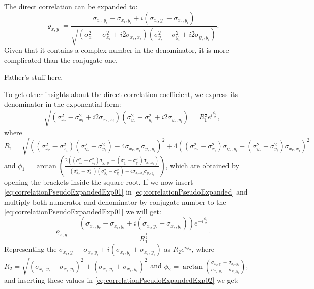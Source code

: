 \documentclass[
]{book}
\begin{document}
The direct correlation can be expanded to:
\begin{equation}
    {\varrho}_{x,y} = \frac{\sigma_{x_r, y_r} - \sigma_{x_i, y_i} + i (\sigma_{x_i, y_r} + \sigma_{x_r, y_i})}{\sqrt{(\sigma_{x_r}^2 - \sigma_{x_i}^2 + i2 \sigma_{x_r,x_i})(\sigma_{y_r}^2 - \sigma_{y_i}^2 + i2 \sigma_{y_r,y_i})}}.
    \label{eq:correlationPseudoExpanded}
\end{equation}
Given that it contains a complex number in the denominator, it is more complicated than the conjugate one.

Father's stuff here.

To get other insights about the direct correlation coefficient, we express its denominator in the exponential form:
\begin{equation}
    {\sqrt{(\sigma_{x_r}^2 - \sigma_{x_i}^2 + i2 \sigma_{x_r,x_i})(\sigma_{y_r}^2 - \sigma_{y_i}^2 + i2 \sigma_{y_r,y_i})}} = R_1^{\frac{1}{2}} e^{i \frac{\phi_1}{2}},
    \label{eq:correlationPseudoExpandedExp01}
\end{equation}
where \(R_1 = \sqrt{\left((\sigma_{x_r}^2 - \sigma_{x_i}^2)(\sigma_{y_r}^2 - \sigma_{y_i}^2) - 4 \sigma_{x_r,x_i} \sigma_{y_r,y_i} \right)^2+ 4 \left( (\sigma_{x_r}^2 - \sigma_{x_i}^2) \sigma_{y_r,y_i} + (\sigma_{y_r}^2 - \sigma_{y_i}^2) \sigma_{x_r,x_i} \right)^2}\) and \(\phi_1=\arctan \left(\frac{2 \left( (\sigma_{x_r}^2 - \sigma_{x_i}^2) \sigma_{y_r,y_i} + (\sigma_{y_r}^2 - \sigma_{y_i}^2) \sigma_{x_r,x_i} \right)}{(\sigma_{x_r}^2 - \sigma_{x_i}^2)(\sigma_{y_r}^2 - \sigma_{y_i}^2) - 4 \sigma_{x_r,x_i} \sigma_{y_r,y_i}}\right)\), which are obtained by opening the brackets inside the square root. If we now insert \eqref{eq:correlationPseudoExpandedExp01} in \eqref{eq:correlationPseudoExpanded} and multiply both numerator and denominator by conjugate number to the \eqref{eq:correlationPseudoExpandedExp01} we will get:
\begin{equation}
    {\varrho}_{x,y} = \frac{\left(\sigma_{x_r, y_r} - \sigma_{x_i, y_i} + i (\sigma_{x_i, y_r} + \sigma_{x_r, y_i})\right)e^{-i \frac{\phi_1}{2}}}{R_1^{\frac{1}{2}}}.
    \label{eq:correlationPseudoExpandedExp02}
\end{equation}
Representing the \(\sigma_{x_r, y_r} - \sigma_{x_i, y_i} + i (\sigma_{x_i, y_r} + \sigma_{x_r, y_i})\) as \(R_2 e^{i \phi_2}\), where \(R_2= \sqrt{(\sigma_{x_r, y_r} - \sigma_{x_i, y_i})^2 + (\sigma_{x_i, y_r} + \sigma_{x_r, y_i})^2}\) and \(\phi_2= \arctan \left( \frac{\sigma_{x_i, y_r} + \sigma_{x_r, y_i}}{\sigma_{x_r, y_r} - \sigma_{x_i, y_i}} \right)\), and inserting these values in \eqref{eq:correlationPseudoExpandedExp02} we get:
\end{document}
